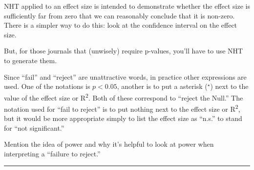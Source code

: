 \documentclass[
  letterpaper,
  DIV=11,
  numbers=noendperiod,
  oneside]{scrreprt}
\begin{document}
\begin{tcolorbox}[enhanced jigsaw, colbacktitle=quarto-callout-note-color!10!white, breakable, opacitybacktitle=0.6, colback=white, left=2mm, arc=.35mm, colframe=quarto-callout-note-color-frame, coltitle=black, toprule=.15mm, opacityback=0, leftrule=.75mm, bottomtitle=1mm, toptitle=1mm, titlerule=0mm, title=\textcolor{quarto-callout-note-color}{\faInfo}\hspace{0.5em}{Use the confidence interval instead}, rightrule=.15mm, bottomrule=.15mm]

NHT applied to an effect size is intended to demonstrate whether the
effect size is sufficiently far from zero that we can reasonably
conclude that it is non-zero. There is a simpler way to do this: look at
the confidence interval on the effect size.

But, for those journals that (unwisely) require p-values, you'll have to
use NHT to generate them.

\end{tcolorbox}

Since ``fail'' and ``reject'' are unattractive words, in practice other
expressions are used. One of the notations is \(p < 0.05\), another is
to put a asterisk (\(^\star\)) next to the value of the effect size or
R\textsuperscript{2}. Both of these correspond to ``reject the Null.''
The notation used for ``fail to reject'' is to put nothing next to the
effect size or R\textsuperscript{2}, but it would be more appropriate
simply to list the effect size as ``n.s.'' to stand for ``not
significant.''

\begin{tcolorbox}[enhanced jigsaw, colbacktitle=quarto-callout-warning-color!10!white, breakable, opacitybacktitle=0.6, colback=white, left=2mm, arc=.35mm, colframe=quarto-callout-warning-color-frame, coltitle=black, toprule=.15mm, opacityback=0, leftrule=.75mm, bottomtitle=1mm, toptitle=1mm, titlerule=0mm, title=\textcolor{quarto-callout-warning-color}{\faExclamationTriangle}\hspace{0.5em}{In Draft: Power}, rightrule=.15mm, bottomrule=.15mm]

Mention the idea of power and why it's helpful to look at power when
interpreting a ``failure to reject.''

\end{tcolorbox}

\begin{center}\rule{0.5\linewidth}{0.5pt}\end{center}
\end{document}
